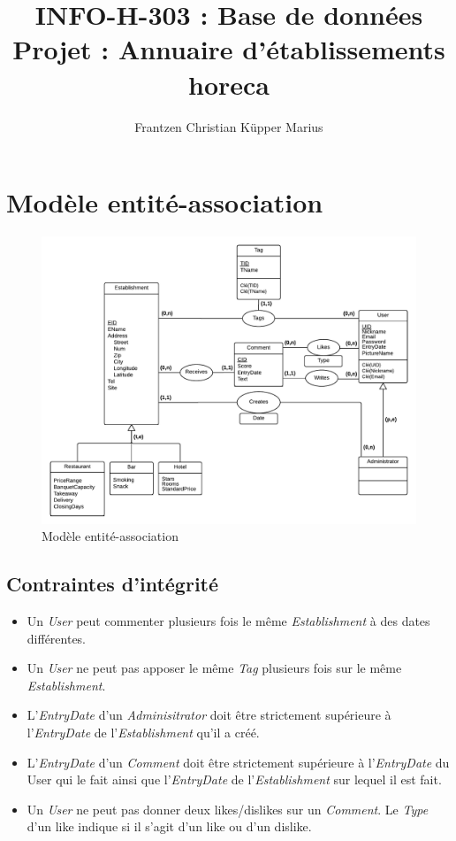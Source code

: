 \documentclass[11pt,a4paper]{report}
\author{Frantzen Christian Küpper Marius}
\title{INFO-H-303 : Base de données\\
		Projet : Annuaire d'établissements horeca}
\begin{document}
\maketitle


\section*{Modèle entité-association}

\begin{figure}[h]
  \centering
  \includegraphics[width=\textwidth]{newModel.pdf}
  \caption{Modèle entité-association}
\end{figure}


\subsection*{Contraintes d'intégrité}

\begin{itemize}
\item Un \textit{User} peut commenter plusieurs fois le même \textit{Establishment} à des dates différentes. 
\item Un \textit{User} ne peut pas apposer le même \textit{Tag} plusieurs fois sur le même \textit{Establishment}.
\item L'\textit{EntryDate} d'un \textit{Adminisitrator} doit être strictement supérieure à l'\textit{EntryDate} de l'\textit{Establishment} qu'il a créé.
\item L'\textit{EntryDate} d'un \textit{Comment} doit être strictement supérieure à l'\textit{EntryDate} du User qui le fait ainsi que l'\textit{EntryDate} de l'\textit{Establishment} sur lequel il est fait. 
\item Un \textit{User} ne peut pas donner deux likes/dislikes sur un \textit{Comment}. Le \textit{Type} d'un like indique si il s'agit d'un like ou d'un dislike.
\end{itemize}
\end{document}
